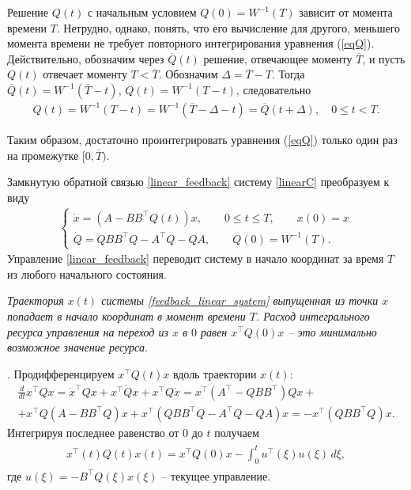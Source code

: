 \documentclass[../main.tex]{subfiles}
\begin{document}
	
	Решение $Q(t)$ с начальным условием $Q(0)=W^{-1}(T)$ зависит от момента времени $T$. Нетрудно, однако, понять, что его вычисление для другого, меньшего момента времени не требует повторного интегрирования уравнения (\ref{eqQ}). Действительно, обозначим через $\overline{Q}(t)$ решение, отвечающее моменту $\overline{T}$, и пусть  $Q(t)$ отвечает моменту $T<\overline{T}$. Обозначим $\Delta = \overline{T}-T$. Тогда $\overline{Q}(t)=W^{-1}(\overline{T}-t)$,  $ Q(t)=W^{-1}(T-t)$, следовательно 
	\begin{gather*}
	Q(t)=W^{-1}(T-t)=W^{-1}(\overline{T}-\Delta-t)= \overline{Q}(t+\Delta), \quad 0\leqslant t <T.
	\end{gather*}
	
	Таким образом, достаточно проинтегрировать уравнения (\ref{eqQ}) только один раз на промежутке $[0,\overline{T})$.
	
	Замкнутую обратной связью \eqref{linear_feedback} систему \eqref{linearC} преобразуем к виду
	\begin{gather}\label{feedback_linear_system}
		\left\lbrace \begin{array}{l}
				\dot{x} = (A - B B^{\top} Q(t) ) x, \qquad 0 \leqslant t \leqslant T, \qquad x(0) = x\\
				\dot{Q} = Q B B^{\top} Q - A^{\top}Q - Q A, \qquad Q(0) = W^{-1}(T).
			\end{array} \right. 
		\end{gather}
	 Управление  \eqref{linear_feedback}
		переводит систему в начало координат за время $T$ из любого начального состояния.
	\begin{utv}
		{\it Траектория $x(t) $ системы {\rm \eqref{feedback_linear_system}} выпущенная из точки $ x $ попадает в начало координат в момент времени $T$. Расход интегрального ресурса управления на переход из $ x $ в $ 0 $ равен $x^{\top} Q(0) x $ -- это минимально возможное значение ресурса}.
	\end{utv}
	\doc. 
		Продифференцируем $x^{\top} Q(t) x$ вдоль траектории $ x(t) $:
		\begin{gather*}
			\frac{d}{dt} x^{\top} Q x = \dot{x}^{\top} Q x + x^{\top} \dot{Q} x + x^{\top} Q \dot{x} = x^{\top} (A^{\top} - Q B B^{\top} )Q x + \\ + x^{\top} Q (A - B B^{\top} Q)x + x^{\top} (Q B B^{\top} Q - A^{\top}Q - Q A) x = 
			-x^{\top} (Q B B^{\top} Q) x.
		\end{gather*}
		Интегрируя последнее равенство от $ 0 $ до $ t $ получаем
		\begin{gather}\label{xqx}
			\begin{gathered}
				x^{\top}(t) Q(t)x(t) = 
				x^{\top} Q(0)x - \int_{0}^{t} u^{\top}(\xi)  u(\xi) \, d\xi,
			\end{gathered}
		\end{gather}
	где $ u(\xi) = -B^{\top} Q(\xi) x(\xi)$ -- текущее управление.
	
\end{document}
